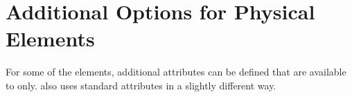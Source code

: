 

\section{Additional Options for Physical Elements}
\label{sec:add-option-PTC}

For some of the \madx elements, additional attributes can be defined
that are available to \ptc only. \ptc also uses standard \madx
attributes in a slightly different way.


